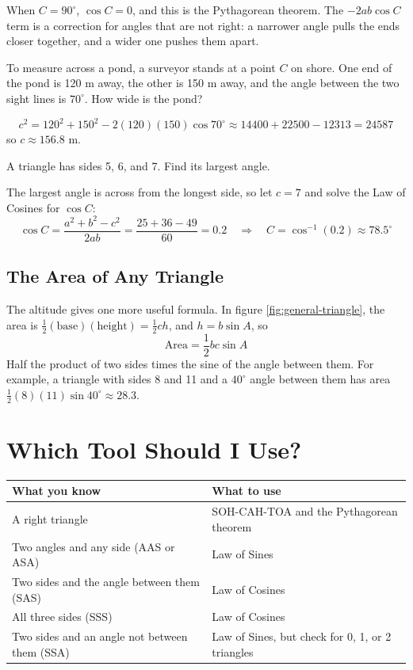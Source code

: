 When $C = 90^\circ$, $\cos C = 0$, and this is the Pythagorean theorem. The
$-2ab\cos C$ term is a correction for angles that are not right: a narrower angle
pulls the ends closer together, and a wider one pushes them apart.

\begin{Worked}
\begin{Problem}
To measure across a pond, a surveyor stands at a point $C$ on
shore. One end of the pond is 120 m away, the other is 150 m away, and the angle
between the two sight lines is $70^\circ$. How wide is the pond?
\end{Problem}
\begin{Solution}
$$c^2 = 120^2 + 150^2 - 2(120)(150)\cos 70^\circ \approx 14400 + 22500 - 12313 = 24587$$
so $c \approx 156.8$ m.
\end{Solution}
\end{Worked}

\begin{Worked}
\begin{Problem}
A triangle has sides 5, 6, and 7. Find its largest angle.
\end{Problem}
\begin{Solution}
The largest angle is across from the longest side, so let $c = 7$
and solve the Law of Cosines for $\cos C$:
$$\cos C = \frac{a^2 + b^2 - c^2}{2ab} = \frac{25 + 36 - 49}{60} = 0.2
\quad\Longrightarrow\quad C = \cos^{-1}(0.2) \approx 78.5^\circ$$
\end{Solution}
\end{Worked}

\subsection{The Area of Any Triangle}
The altitude gives one more useful formula. In figure \ref{fig:general-triangle}, the
area is $\frac{1}{2}(\text{base})(\text{height}) = \frac{1}{2}ch$, and $h = b\sin A$, so
$$\text{Area} = \frac{1}{2}bc\sin A$$
Half the product of two sides times the sine of the angle between them. For example,
a triangle with sides 8 and 11 and a $40^\circ$ angle between them has area
$\frac{1}{2}(8)(11)\sin 40^\circ \approx 28.3$.

\section{Which Tool Should I Use?}
\begin{center}
\begin{tabular}{l|l}
What you know & What to use \\
\hline
A right triangle & SOH-CAH-TOA and the Pythagorean theorem \\
Two angles and any side (AAS or ASA) & Law of Sines \\
Two sides and the angle between them (SAS) & Law of Cosines \\
All three sides (SSS) & Law of Cosines \\
Two sides and an angle not between them (SSA) & Law of Sines, but check for 0, 1, or 2 triangles \\
\end{tabular}
\end{center}

